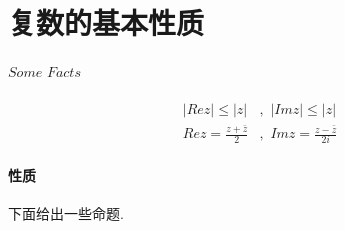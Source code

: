 \newpage
\section{复数的基本性质}
\paragraph{$Some \,\, Facts$}
	\begin{align}
		\left| Rez \right| \leq \left| z \right| &, \,\, \left| Imz \right| \leq \left| z \right| \\
		Rez = \frac{z + \bar{z}}{2} &, \,\, Imz = \frac{z - \bar{z}}{2i}
	\end{align}

\vspace*{2em}
\paragraph{性质}
	下面给出一些命题.
